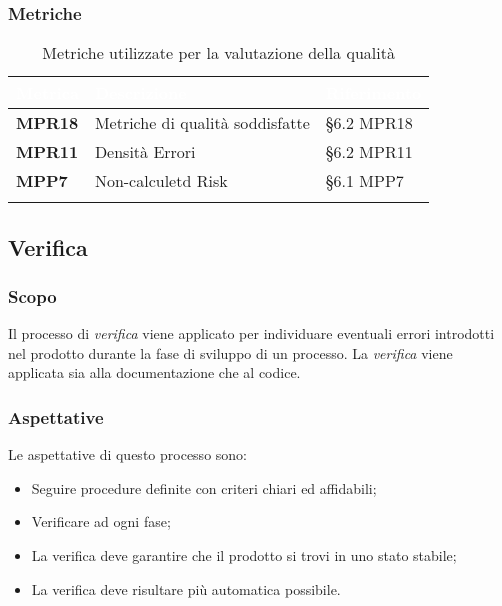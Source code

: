 			\subsubsection{Metriche}
			\setlength{\freewidth}{\dimexpr\textwidth-0\tabcolsep}
			\renewcommand{\arraystretch}{1.5}
			\setlength{\aboverulesep}{0pt}
			\setlength{\belowrulesep}{0pt}
			\begin{longtable}{L{.22\freewidth} L{.4\freewidth} L{.2\freewidth}}
				\toprule
				\textcolor{white}{\textbf{Metrica}}&
				\textcolor{white}{\textbf{Descrizione}}&	
				\textcolor{white}{\textbf{Riferimento}}\\
				\toprule
				\endhead
				
				\textbf{MPR18} & Metriche di qualità soddisfatte & \S 6.2 MPR18 \\
				\textbf{MPR11} & Densità Errori & \S 6.2 MPR11 \\
				\textbf{MPP7} & Non-calculetd Risk & \S 6.1 MPP7 \\

				\bottomrule
				\caption*{Metriche utilizzate per la valutazione della qualità}
			\end{longtable}
			
		
	
		\subsection{Verifica}
			\subsubsection{Scopo}
				Il processo di \emph{verifica} viene applicato per individuare eventuali errori introdotti nel prodotto durante la fase di sviluppo di un processo. La \emph{verifica} viene applicata sia alla documentazione che al codice. %
			\subsubsection{Aspettative}
				Le aspettative di questo processo sono:
					\begin{itemize}
						\item Seguire procedure definite con criteri chiari ed affidabili;
						\item Verificare ad ogni fase;
						\item La verifica deve garantire che il prodotto si trovi in uno stato stabile;
						\item La verifica deve risultare più automatica possibile.
					\end{itemize}
				
